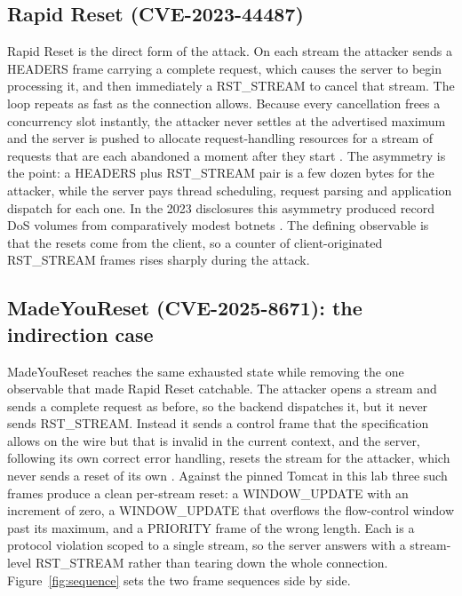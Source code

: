\documentclass[a4paper,fleqn]{cas-dc}
\begin{document}
\subsection{Rapid Reset (CVE-2023-44487)}\label{sec:rapidreset-background}

Rapid Reset is the direct form of the attack. On each stream the attacker sends a HEADERS frame carrying a complete request, which causes the server to begin processing it, and then immediately a RST\_STREAM to cancel that stream. The loop repeats as fast as the connection allows. Because every cancellation frees a concurrency slot instantly, the attacker never settles at the advertised maximum and the server is pushed to allocate request-handling resources for a stream of requests that are each abandoned a moment after they start \cite{rapidresetCloudflareTech}. The asymmetry is the point: a HEADERS plus RST\_STREAM pair is a few dozen bytes for the attacker, while the server pays thread scheduling, request parsing and application dispatch for each one. In the 2023 disclosures this asymmetry produced record DoS volumes from comparatively modest botnets \cite{rapidresetCloudflare,cisaRapidReset}. The defining observable is that the resets come from the client, so a counter of client-originated RST\_STREAM frames rises sharply during the attack.

\subsection{MadeYouReset (CVE-2025-8671): the indirection case}\label{sec:madeyoureset-background}

MadeYouReset reaches the same exhausted state while removing the one observable that made Rapid Reset catchable. The attacker opens a stream and sends a complete request as before, so the backend dispatches it, but it never sends RST\_STREAM. Instead it sends a control frame that the specification allows on the wire but that is invalid in the current context, and the server, following its own correct error handling, resets the stream for the attacker, which never sends a reset of its own \cite{madeyouresetCloudflare,imperva}. Against the pinned Tomcat in this lab three such frames produce a clean per-stream reset: a WINDOW\_UPDATE with an increment of zero, a WINDOW\_UPDATE that overflows the flow-control window past its maximum, and a PRIORITY frame of the wrong length. Each is a protocol violation scoped to a single stream, so the server answers with a stream-level RST\_STREAM rather than tearing down the whole connection. Figure~\ref{fig:sequence} sets the two frame sequences side by side.
\end{document}
